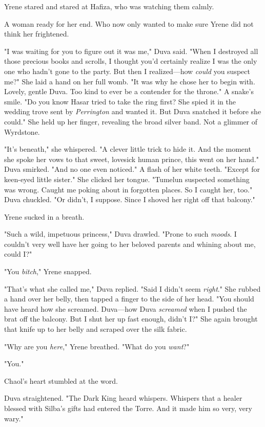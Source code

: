 Yrene stared and stared at Hafiza, who was watching them calmly.

A woman ready for her end.
Who now only wanted to make sure Yrene did not think her frightened.

"I was waiting for you to figure out it was me," Duva said.
"When I destroyed all those precious books and scrolls, I thought you'd certainly realize I was the only one who hadn't gone to the party.
But then I realized---how \emph{could} you suspect me?"
She laid a hand on her full womb.
"It was why he chose her to begin with.
Lovely, gentle Duva.
Too kind to ever be a contender for the throne."
A snake's smile.
"Do you know Hasar tried to take the ring first?
She spied it in the wedding trove sent by \emph{Perrington} and wanted it.
But Duva snatched it before she could."
She held up her finger, revealing the broad silver band.
Not a glimmer of Wyrdstone.

"It's beneath," she whispered.
"A clever little trick to hide it.
And the moment she spoke her vows to that sweet, lovesick human prince, this went on her hand."
Duva smirked.
"And no one even noticed."
A flash of her white teeth.
"Except for keen-eyed little sister."
She clicked her tongue.
"Tumelun suspected something was wrong.
Caught me poking about in forgotten places.
So I caught her, too."
Duva chuckled.
"Or didn't, I suppose.
Since I shoved her right off that balcony."

Yrene sucked in a breath.

"Such a wild, impetuous princess," Duva drawled.
"Prone to such \emph{moods}.
I couldn't very well have her going to her beloved parents and whining about me, could I?"

"You \emph{bitch}," Yrene snapped.

"That's what she called me," Duva replied.
"Said I didn't seem \emph{right}."
She rubbed a hand over her belly, then tapped a finger to the side of her head.
"You should have heard how she screamed.
Duva---how Duva \emph{screamed} when I pushed the brat off the balcony.
But I shut her up fast enough, didn't I?"
She again brought that knife up to her belly and scraped over the silk fabric.

"Why are you \emph{here}," Yrene breathed.
"What do you \emph{want}?"

"You."

Chaol's heart stumbled at the word.

Duva straightened.
"The Dark King heard whispers.
Whispers that a healer blessed with Silba's gifts had entered the Torre.
And it made him so very, very wary."

